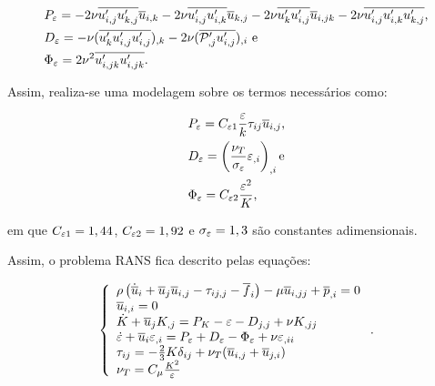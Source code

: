 \begin{subequations}
    \begin{align}
         & P_\varepsilon=-2\nu\overline{u'_{i,j}u'_{k,j}}\overline{u}_{i,k}-2\nu\overline{u'_{i,j}u'_{i,k}}\overline{u}_{k,j}-2\nu\overline{u'_ku'_{i,j}}\overline{u}_{i,jk}-2\nu\overline{u'_{i,j}u'_{i,k}u'_{k,j}} \text{,} \\
         & D_\varepsilon=-\nu(\overline{u'_ku'_{i,j}u'_{i,j}})_{,k}-2\nu(\overline{\mathcal{P}'_{,j}u'_{i,j}})_{,i} \text{ e}                                                                                \\
         & \Phi_\varepsilon=2\nu^2\overline{u'_{i,jk}u'_{i,jk}}\text{.}
    \end{align}
\end{subequations}

Assim, realiza-se uma modelagem sobre os termos necessários como:

\begin{subequations}
    \begin{align}
         & P_\varepsilon=C_{\varepsilon 1}\frac{\varepsilon}{k}\tau_{ij}\overline{u}_{i,j}\text{,}   \\
         & D_\varepsilon=\left({\frac{\nu_T}{\sigma_\varepsilon}\varepsilon_{,i}}\right)_{,i}\text{e} \\
         & \Phi_\varepsilon=C_{\varepsilon 2}\frac{\varepsilon^2}{K}\text{,}
    \end{align}
\end{subequations}

\noindent em que $C_{\varepsilon 1}=1,44$, $C_{\varepsilon 2}=1,92$ e $\sigma_\varepsilon=1,3$ são constantes adimensionais.

Assim, o problema RANS fica descrito pelas equações:

\begin{equation}
    \left\{
    \begin{array}{l}
        \rho\left({\dot{\overline{u}}_i+\overline{u}_j\overline{u}_{i,j}-\tau_{ij,j}-\overline{f}_i}\right)-\mu\overline{u}_{i,jj}+\overline{p}_{,i}=0    \\
        \overline{u}_{i,i}=0                                                                                               \\
        \dot{K}+\overline{u}_jK_{,j}=P_K-\varepsilon-D_{j,j}+\nu K_{,jj}                                                   \\
        \dot{\varepsilon}+\overline{u}_i\varepsilon_{,i}=P_\varepsilon+D_\varepsilon-\Phi_\varepsilon+\nu\varepsilon_{,ii} \\
        \tau_{ij}=-\frac{2}{3}K\delta_{ij}+\nu_T(\overline{u}_{i,j}+\overline{u}_{j,i})                                         \\
        \nu_T=C_\mu\frac{K^2}{\varepsilon}
    \end{array}
    \right.\text{.}
\end{equation}